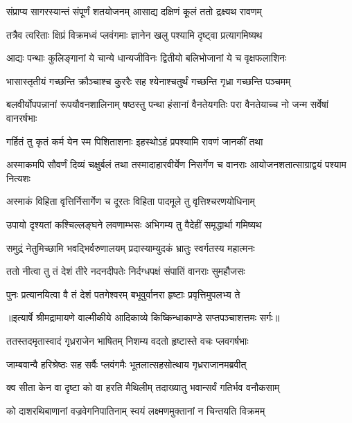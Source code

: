 \twolineshloka
{संप्राप्य सागरस्यान्तं संपूर्णं शतयोजनम्}
{आसाद्य दक्षिणं कूलं ततो द्रक्ष्यथ रावणम्} %

\twolineshloka
{तत्रैव त्वरिताः क्षिप्रं विक्रमध्वं प्लवंगमाः}
{ज्ञानेन खलु पश्यामि दृष्ट्वा प्रत्यागमिष्यथ} %

\twolineshloka
{आद्यः पन्थाः कुलिङ्गानां ये चान्ये धान्यजीविनः}
{द्वितीयो बलिभोजानां ये च वृक्षफलाशिनः} %

\twolineshloka
{भासास्तृतीयं गच्छन्ति क्रौञ्चाश्च कुररैः सह}
{श्येनाश्चतुर्थं गच्छन्ति गृध्रा गच्छन्ति पञ्चमम्} %

\threelineshloka
{बलवीर्योपपन्नानां रूपयौवनशालिनाम्}
{षष्ठस्तु पन्था हंसानां वैनतेयगतिः परा}
{वैनतेयाच्च नो जन्म सर्वेषां वानरर्षभाः} %

\twolineshloka
{गर्हितं तु कृतं कर्म येन स्म पिशिताशनाः}
{इहस्थोऽहं प्रपश्यामि रावणं जानकीं तथा} %

\threelineshloka
{अस्माकमपि सौवर्णं दिव्यं चक्षुर्बलं तथा}
{तस्मादाहारवीर्येण निसर्गेण च वानराः}
{आयोजनशतात्साग्राद्वयं पश्याम नित्यशः} %

\twolineshloka
{अस्माकं विहिता वृत्तिर्निसार्गेण च दूरतः}
{विहिता पादमूले तु वृत्तिश्चरणयोधिनाम्} %

\twolineshloka
{उपायो दृश्यतां कश्चिल्लङ्घने लवणाम्भसः}
{अभिगम्य तु वैदेहीं समृद्धार्था गमिष्यथ} %

\twolineshloka
{समुद्रं नेतुमिच्छामि भवद्भिर्वरुणालयम्}
{प्रदास्याम्युदकं भ्रातुः स्वर्गतस्य महात्मनः} %

\twolineshloka
{ततो नीत्वा तु तं देशं तीरे नदनदीपतेः}
{निर्दग्धपक्षं संपातिं वानराः सुमहौजसः} %

\twolineshloka
{पुनः प्रत्यानयित्वा वै तं देशं पतगेश्वरम्}
{बभूवुर्वानरा हृष्टाः प्रवृत्तिमुपलभ्य ते} %


{॥इत्यार्षे श्रीमद्रामायणे वाल्मीकीये आदिकाव्ये किष्किन्धाकाण्डे सप्तपञ्चाशत्तमः सर्गः॥}


\twolineshloka
{ततस्तदमृतास्वादं गृध्रराजेन भाषितम्}
{निशम्य वदतो हृष्टास्ते वचः प्लवगर्षभाः} %

\twolineshloka
{जाम्बवान्वै हरिश्रेष्ठः सह सर्वैः प्लवंगमैः}
{भूतलात्सहसोत्थाय गृध्रराजानमब्रवीत्} %

\twolineshloka
{क्व सीता केन वा दृष्टा को वा हरति मैथिलीम्}
{तदाख्यातु भवान्सर्वं गतिर्भव वनौकसाम्} %

\twolineshloka
{को दाशरथिबाणानां वज्रवेगनिपातिनाम्}
{स्वयं लक्ष्मणमुक्तानां न चिन्तयति विक्रमम्} %

